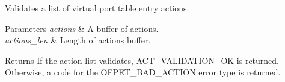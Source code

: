Validates a list of virtual port table entry actions. 


\begin{DoxyParams}{Parameters}
{\em actions} & A buffer of actions. \\
\hline
{\em actions\+\_\+len} & Length of actions buffer. \\
\hline
\end{DoxyParams}
\begin{DoxyReturn}{Returns}
If the action list validates, A\+C\+T\+\_\+\+V\+A\+L\+I\+D\+A\+T\+I\+O\+N\+\_\+\+OK is returned. Otherwise, a code for the O\+F\+P\+E\+T\+\_\+\+B\+A\+D\+\_\+\+A\+C\+T\+I\+ON error type is returned. 
\end{DoxyReturn}
